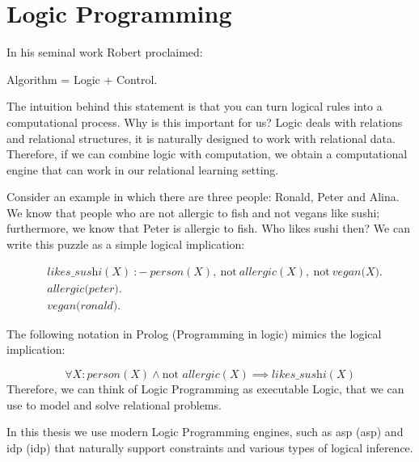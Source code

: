 \section{Logic Programming}
In his seminal work Robert \textcite{kowalski} proclaimed:
\begin{center}
  Algorithm = Logic + Control.
\end{center}

The intuition behind this statement is that
you can turn logical rules into a computational process. 
Why is this important for us? Logic deals with
relations and relational structures, it is naturally designed to
work with relational data. Therefore, if we can combine logic
with computation, we obtain a computational engine that can work in
our relational learning setting.

Consider an example in which there are three people: Ronald, Peter and
Alina. We know that people who are not allergic to fish and not vegans like sushi; 
furthermore, we know that Peter is allergic to fish. 
Who likes sushi then? We can write this puzzle as a
simple logical implication:

\begin{equation*}
    \begin{aligned}
& \textit{likes\_sushi}(X)~{:}{-}~\textit{person}(X),~\text{not}~
        \textit{allergic}(X), ~\text{not}~\textit{vegan(X)}. \\
&       \textit{allergic(peter)}. \\
&       \textit{vegan(ronald)}.
    \end{aligned}
\end{equation*}

The following notation in Prolog (Programming in logic)
\parencite{prolog_original} mimics the logical implication:

\begin{equation*}
  \forall X: \textit{person}(X) \wedge \text{not } \textit{allergic}(X)
  \implies \textit{likes\_sushi}(X)
\end{equation*}
Therefore, we can think of Logic Programming as executable Logic, that
we can use to model and solve relational problems.

In this thesis we use modern Logic Programming engines, such
as \acrlong{asp} (\acrshort{asp}) \parencite{ASPbook,whatisasp} and
\acrlong{idp} (\acrshort{idp})
\parencite{idp} %
that naturally support constraints and various types of logical
inference.


